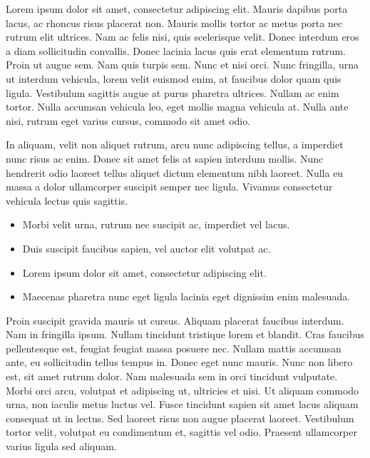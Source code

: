 \documentclass[11pt,oneside,openany]{book}
\begin{document}
Lorem ipsum dolor sit amet, consectetur adipiscing elit. Mauris dapibus porta lacus, ac rhoncus risus placerat non. Mauris mollis tortor ac metus porta nec rutrum elit ultrices. Nam ac felis nisi, quis scelerisque velit. Donec interdum eros a diam sollicitudin convallis. Donec lacinia lacus quis erat elementum rutrum. Proin ut augue sem. Nam quis turpis sem. Nunc et nisi orci. Nunc fringilla, urna ut interdum vehicula, lorem velit euismod enim, at faucibus dolor quam quis ligula. Vestibulum sagittis augue at purus pharetra ultrices. Nullam ac enim tortor. Nulla accumsan vehicula leo, eget mollis magna vehicula at. Nulla ante nisi, rutrum eget varius cursus, commodo sit amet odio.

In aliquam, velit non aliquet rutrum, arcu nunc adipiscing tellus, a imperdiet nunc risus ac enim. Donec sit amet felis at sapien interdum mollis. Nunc hendrerit odio laoreet tellus aliquet dictum elementum nibh laoreet. Nulla eu massa a dolor ullamcorper suscipit semper nec ligula. Vivamus consectetur vehicula lectus quis sagittis.

\begin{itemize}
\item Morbi velit urna, rutrum nec suscipit ac, imperdiet vel lacus.
\item Duis suscipit faucibus sapien, vel auctor elit volutpat ac.
\item Lorem ipsum dolor sit amet, consectetur adipiscing elit.
\item Maecenas pharetra nunc eget ligula lacinia eget dignissim enim malesuada.
\end{itemize}

Proin suscipit gravida mauris ut cursus. Aliquam placerat faucibus interdum. Nam in fringilla ipsum. Nullam tincidunt tristique lorem et blandit. Cras faucibus pellentesque est, feugiat feugiat massa posuere nec. Nullam mattis accumsan ante, eu sollicitudin tellus tempus in. Donec eget nunc mauris. Nunc non libero est, sit amet rutrum dolor. Nam malesuada sem in orci tincidunt vulputate. Morbi orci arcu, volutpat et adipiscing ut, ultricies et nisi. Ut aliquam commodo urna, non iaculis metus luctus vel. Fusce tincidunt sapien sit amet lacus aliquam consequat ut in lectus. Sed laoreet risus non augue placerat laoreet. Vestibulum tortor velit, volutpat eu condimentum et, sagittis vel odio. Praesent ullamcorper varius ligula sed aliquam.



\appendix
\listoffigures
\end{document}
